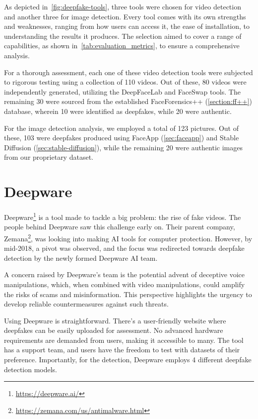 As depicted in~\autoref{fig:deepfake-tools}, three tools were chosen for video
detection and another three for image detection. Every tool comes with its own
strengths and weaknesses, ranging from how users can access it, the ease of
installation, to understanding the results it produces. The selection aimed to
cover a range of capabilities, as shown in~\autoref{tab:evaluation_metrics},
to ensure a comprehensive analysis.

For a thorough assessment, each one of these video detection tools were subjected
to rigorous testing using a collection of 110 videos. Out of these, 80 videos were independently
generated, utilizing the DeepFaceLab and FaceSwap tools. The remaining 30
were sourced from the established FaceForensics++ (\autoref{section:ff++})
database, wherein 10 were identified as deepfakes, while 20 were authentic.

For the image detection analysis, we employed a total of 123 pictures. Out of
these, 103 were deepfakes produced using FaceApp (\autoref{sec:faceapp}) and
Stable Diffusion (\autoref{sec:stable-diffusion}), while the
remaining 20 were authentic images from our proprietary dataset.

\section{Deepware}\label{sec:deepware}
Deepware\footnote{\url{https://deepware.ai/}} is a tool made to tackle a big
problem: the rise of fake videos. The people behind
Deepware saw this challenge early on. Their parent company,
Zemana\footnote{\url{https://zemana.com/us/antimalware.html}},
was looking into making \ac{AI} tools for computer protection. However,
by mid-2018, a pivot was observed, and the focus was redirected towards
deepfake detection by the newly formed Deepware \ac{AI} team.

A concern raised by Deepware's team is the potential advent of deceptive
voice manipulations, which, when combined with video manipulations, could
amplify the risks of scams and misinformation. This perspective highlights
the urgency to develop reliable countermeasures against such threats.

Using Deepware is straightforward. There's a user-friendly website where
deepfakes can be easily uploaded for assessment. No advanced hardware
requirements are demanded from users, making it accessible to many.
The tool has a support team, and users have the freedom to test with
datasets of their preference. Importantly, for the detection,
Deepware employs 4 different deepfake detection models.

